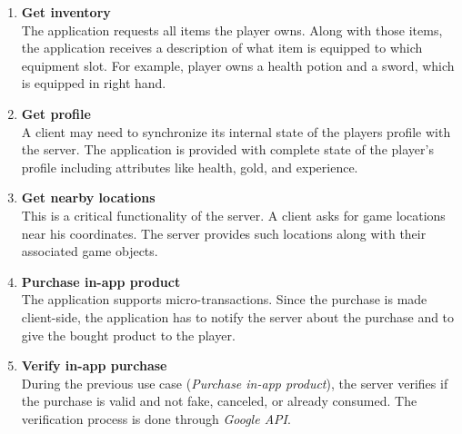 	\begin{enumerate}
		\item \textbf{Get inventory}\\
		The application requests all items the player owns. Along with those items, the application receives a description of what item is equipped to which equipment slot. For example, player owns a health potion and a sword, which is equipped in right hand.
		
		\item \textbf{Get profile}\\
		A client may need to synchronize its internal state of the players profile with the server. The application is provided with complete state of the player's profile including attributes like health, gold, and experience.
		
		
		\item \textbf{Get nearby locations}\\
		This is a critical functionality of the server. A client asks for game locations near his coordinates. The server provides such locations along with their associated game objects.
		
		
		\item \textbf{Purchase in-app product}\\
		The application supports micro-transactions. Since the purchase is made client-side, the application has to notify the server about the purchase and to give the bought product to the player. 
		
		
		\item \textbf{Verify in-app purchase}\\
		During the previous use case (\textit{Purchase in-app product}), the server verifies if the purchase is valid and not fake, canceled, or already consumed. The verification process is done through \textit{Google API}.
		
		
	\end{enumerate}
	

